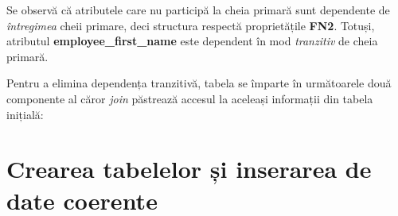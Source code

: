 \documentclass[a4paper, oneside, 12pt]{article}
\newcommand{\rowstyle}[1]{\gdef\currentrowstyle{#1}%
  #1\ignorespaces
}
\begin{document}
\begin{table}[H]
\centering
\caption*{Tabela \textbf{SUBSCRIPTION\_0}:}
\end{table}

Se observă că atributele care nu participă la cheia primară sunt dependente de
\emph{întregimea} cheii primare, deci structura respectă proprietățile \textbf{FN2}.
Totuși, atributul \textbf{employee\_first\_name} este dependent în mod
\emph{tranzitiv} de cheia primară.

Pentru a elimina dependența tranzitivă, tabela se împarte în următoarele două
componente al căror \emph{join} păstrează accesul la aceleași informații din
tabela inițială:

\begin{table}[H]
\centering
\caption*{Tabela \textbf{SUBSCRIPTION\_1}:}
\end{table}

\begin{table}[H]
\centering
\caption*{Tabela \textbf{SUBSCRIPTION\_2}:}
\end{table}

\section{Crearea tabelelor și inserarea de date coerente}
\end{document}
